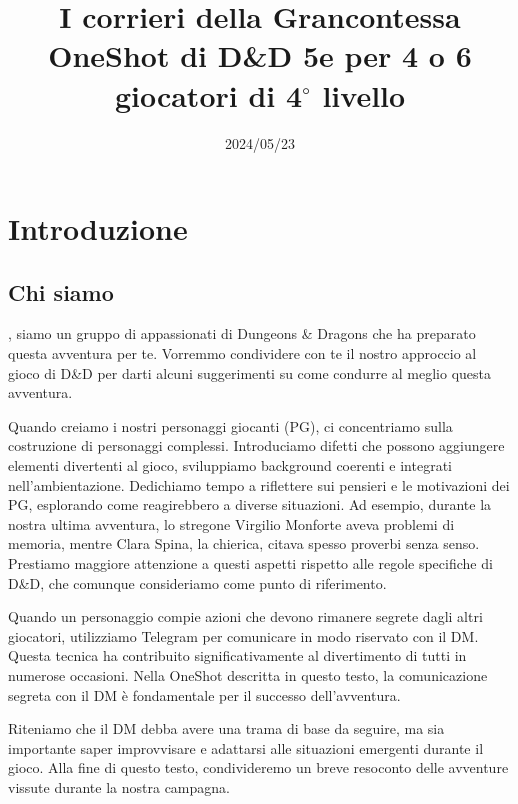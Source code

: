 \documentclass[letterpaper,twocolumn,openany,nodeprecatedcode]{dndbook}
\title{I corrieri della Grancontessa \\
\large OneShot di D\&D 5e per 4 o 6 giocatori di 4$^\circ$ livello}
\author{}
\date{2024/05/23}
\begin{document}
\frontmatter

\maketitle

\tableofcontents


\mainmatter%





\chapter{Introduzione}

\section{Chi siamo}
, siamo un gruppo di appassionati di Dungeons \& Dragons che ha preparato questa avventura per te. Vorremmo condividere con te il nostro approccio al gioco di D\&D per darti alcuni suggerimenti su come condurre al meglio questa avventura.

Quando creiamo i nostri personaggi giocanti (PG), ci concentriamo sulla costruzione di personaggi complessi. Introduciamo difetti che possono aggiungere elementi divertenti al gioco, sviluppiamo background coerenti e integrati nell'ambientazione. Dedichiamo tempo a riflettere sui pensieri e le motivazioni dei PG, esplorando come reagirebbero a diverse situazioni. Ad esempio, durante la nostra ultima avventura, lo stregone Virgilio Monforte aveva problemi di memoria, mentre Clara Spina, la chierica, citava spesso proverbi senza senso. Prestiamo maggiore attenzione a questi aspetti rispetto alle regole specifiche di D\&D, che comunque consideriamo come punto di riferimento.

Quando un personaggio compie azioni che devono rimanere segrete dagli altri giocatori, utilizziamo Telegram per comunicare in modo riservato con il DM. Questa tecnica ha contribuito significativamente al divertimento di tutti in numerose occasioni. Nella OneShot descritta in questo testo, la comunicazione segreta con il DM è fondamentale per il successo dell'avventura.

Riteniamo che il DM debba avere una trama di base da seguire, ma sia importante saper improvvisare e adattarsi alle situazioni emergenti durante il gioco. Alla fine di questo testo, condivideremo un breve resoconto delle avventure vissute durante la nostra campagna.
\end{document}

